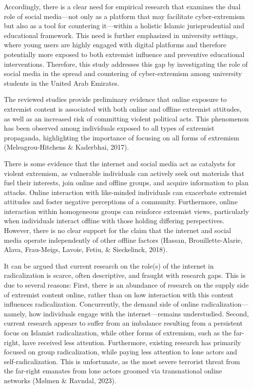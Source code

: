 \documentclass[10pt]{NSP1}
\begin{document}
	Accordingly, there is a clear need for empirical research that examines the dual role of social media—not only as a platform that may facilitate cyber-extremism but also as a tool for countering it—within a holistic Islamic jurisprudential and educational framework. This need is further emphasized in university settings, where young users are highly engaged with digital platforms and therefore potentially more exposed to both extremist influence and preventive educational interventions. Therefore, this study addresses this gap by investigating the role of social media in the spread and countering of cyber-extremism among university students in the United Arab Emirates.
	
	The reviewed studies provide preliminary evidence that online exposure to extremist content is associated with both online and offline extremist attitudes, as well as an increased risk of committing violent political acts. This phenomenon has been observed among individuals exposed to all types of extremist propaganda, highlighting the importance of focusing on all forms of extremism (Meleagrou-Hitchens \& Kaderbhai, 2017).
	
	There is some evidence that the internet and social media act as catalysts for violent extremism, as vulnerable individuals can actively seek out materials that fuel their interests, join online and offline groups, and acquire information to plan attacks. Online interaction with like-minded individuals can exacerbate extremist attitudes and foster negative perceptions of a community. Furthermore, online interaction within homogeneous groups can reinforce extremist views, particularly when individuals interact offline with those holding differing perspectives. However, there is no clear support for the claim that the internet and social media operate independently of other offline factors (Hassan, Brouillette-Alarie, Alava, Frau-Meigs, Lavoie, Fetiu, \& Sieckelinck, 2018).
	
	It can be argued that current research on the role(s) of the internet in radicalization is scarce, often descriptive, and fraught with research gaps. This is due to several reasons: First, there is an abundance of research on the supply side of extremist content online, rather than on how interaction with this content influences radicalization. Concurrently, the demand side of online radicalization—namely, how individuals engage with the internet—remains understudied. Second, current research appears to suffer from an imbalance resulting from a persistent focus on Islamist radicalization, while other forms of extremism, such as the far-right, have received less attention. Furthermore, existing research has primarily focused on group radicalization, while paying less attention to lone actors and self-radicalization. This is unfortunate, as the most severe terrorist threat from the far-right emanates from lone actors groomed via transnational online networks (M\o lmen \& Ravndal, 2023).
	
\end{document}
